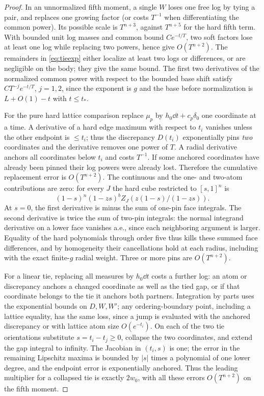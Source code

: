 \begin{proof}
In an unnormalized fifth moment, a single \(W\) loses one free log by tying a pair, and replaces one growing factor (or costs \(T^{-1}\) when differentiating the common power). Its possible scale is \(T^{n+3}\), against \(T^{n+5}\) for the hard fifth term. With bounded unit log masses and common bound \(Ce^{-t/T}\), two soft factors lose at least one log while replacing two powers, hence give \(O(T^{n+2})\). The remainders in \eqref{eq:tieexp} either localize at least two logs or differences, or are negligible on the body; they give the same bound. The first two derivatives of the normalized common power with respect to the bounded base shift satisfy \(CT^{-j}e^{-t/T}\), \(j=1,2\), since the exponent is \(g\) and the base before normalization is \(L+O(1)-t\) with \(t\le t_*\).

For the pure hard lattice comparison replace \(\mu_p\) by \(h_0\dd t+c_p\delta_0\) one coordinate at a time. A derivative of a hard edge maximum with respect to \(t_i\) vanishes unless the other endpoint is \(\le t_i\); thus the discrepancy \(D(t_i)\) exponentially pins \emph{two} coordinates and the derivative removes one power of \(T\). A radial derivative anchors all coordinates below \(t_i\) and costs \(T^{-1}\). If some anchored coordinates have already been pinned their log powers were already lost. Therefore the cumulative replacement error is \(O(T^{n+2})\). The continuous and the one- and two-atom contributions are zero: for every \(J\) the hard cube restricted to \([s,1]^n\) is
\[
 (1-s)^n(1-zs)^bZ_J(z(1-s)/(1-zs)).
\]
At \(s=0\), the first derivative is minus the sum of one-pin face integrals. The second derivative is twice the sum of two-pin integrals: the normal integrand derivative on a lower face vanishes a.e., since each neighboring argument is larger. Equality of the hard polynomials through order five thus kills these summed face differences, and by homogeneity their cancellations hold at each radius, including with the exact finite-\(g\) radial weight. Three or more pins are \(O(T^{n+2})\).

For a linear tie, replacing all measures by \(h_0\dd t\) costs a further log: an atom or discrepancy anchors a changed coordinate as well as the tied gap, or if that coordinate belongs to the tie it anchors both partners. Integration by parts uses the exponential bounds on \(D,W,W'\); any ordering-boundary point, including a lattice equality, has the same loss, since a jump is evaluated with the anchored discrepancy or with lattice atom size \(O(e^{-t_i})\). On each of the two tie orientations substitute \(s=t_i-t_j\ge0\), collapse the two coordinates, and extend the gap integral to infinity. The Jacobian in \((t_i,s)\) is one; the error in the remaining Lipschitz maxima is bounded by \(|s|\) times a polynomial of one lower degree, and the endpoint error is exponentially anchored. Thus the leading multiplier for a collapsed tie is exactly \(2w_0\), with all these errors \(O(T^{n+2})\) on the fifth moment.


\end{proof}
